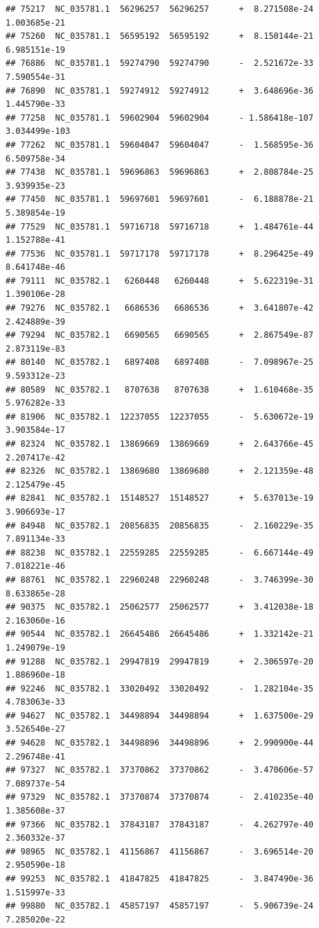 \documentclass[]{article}
\begin{document}
\begin{verbatim}
## 75217  NC_035781.1  56296257  56296257      +  8.271508e-24  1.003685e-21
## 75260  NC_035781.1  56595192  56595192      +  8.150144e-21  6.985151e-19
## 76886  NC_035781.1  59274790  59274790      -  2.521672e-33  7.590554e-31
## 76890  NC_035781.1  59274912  59274912      +  3.648696e-36  1.445790e-33
## 77258  NC_035781.1  59602904  59602904      - 1.586418e-107 3.034499e-103
## 77262  NC_035781.1  59604047  59604047      -  1.568595e-36  6.509758e-34
## 77438  NC_035781.1  59696863  59696863      +  2.808784e-25  3.939935e-23
## 77450  NC_035781.1  59697601  59697601      -  6.188878e-21  5.389854e-19
## 77529  NC_035781.1  59716718  59716718      +  1.484761e-44  1.152788e-41
## 77536  NC_035781.1  59717178  59717178      +  8.296425e-49  8.641748e-46
## 79111  NC_035782.1   6260448   6260448      +  5.622319e-31  1.390106e-28
## 79276  NC_035782.1   6686536   6686536      +  3.641807e-42  2.424889e-39
## 79294  NC_035782.1   6690565   6690565      +  2.867549e-87  2.873119e-83
## 80140  NC_035782.1   6897408   6897408      -  7.098967e-25  9.593312e-23
## 80589  NC_035782.1   8707638   8707638      +  1.610468e-35  5.976282e-33
## 81906  NC_035782.1  12237055  12237055      -  5.630672e-19  3.903584e-17
## 82324  NC_035782.1  13869669  13869669      +  2.643766e-45  2.207417e-42
## 82326  NC_035782.1  13869680  13869680      +  2.121359e-48  2.125479e-45
## 82841  NC_035782.1  15148527  15148527      +  5.637013e-19  3.906693e-17
## 84948  NC_035782.1  20856835  20856835      -  2.160229e-35  7.891134e-33
## 88238  NC_035782.1  22559285  22559285      -  6.667144e-49  7.018221e-46
## 88761  NC_035782.1  22960248  22960248      -  3.746399e-30  8.633865e-28
## 90375  NC_035782.1  25062577  25062577      +  3.412038e-18  2.163060e-16
## 90544  NC_035782.1  26645486  26645486      +  1.332142e-21  1.249079e-19
## 91288  NC_035782.1  29947819  29947819      +  2.306597e-20  1.886960e-18
## 92246  NC_035782.1  33020492  33020492      -  1.282104e-35  4.783063e-33
## 94627  NC_035782.1  34498894  34498894      +  1.637500e-29  3.526540e-27
## 94628  NC_035782.1  34498896  34498896      +  2.990900e-44  2.296748e-41
## 97327  NC_035782.1  37370862  37370862      -  3.470606e-57  7.089737e-54
## 97329  NC_035782.1  37370874  37370874      -  2.410235e-40  1.385608e-37
## 97366  NC_035782.1  37843187  37843187      -  4.262797e-40  2.360332e-37
## 98965  NC_035782.1  41156867  41156867      -  3.696514e-20  2.950590e-18
## 99253  NC_035782.1  41847825  41847825      -  3.847490e-36  1.515997e-33
## 99880  NC_035782.1  45857197  45857197      -  5.906739e-24  7.285020e-22

\end{verbatim}
\end{document}

